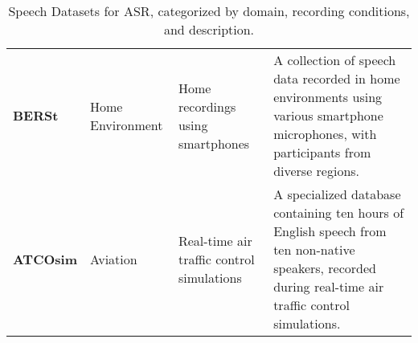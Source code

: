 \begin{table*}[h!]
\begin{tabular}{p{3cm}p{2.5cm}p{2.5cm}p{6cm}}
\textbf{BERSt} & Home Environment & Home recordings using smartphones & A collection of speech data recorded in home environments using various smartphone microphones, with participants from diverse regions. \\
\textbf{ATCOsim} & Aviation & Real-time air traffic control simulations & A specialized database containing ten hours of English speech from ten non-native speakers, recorded during real-time air traffic control simulations. \\ \bottomrule
\end{tabular}
\caption{Speech Datasets for ASR, categorized by domain, recording conditions, and description.}
\label{tab:datasets}
\end{table*}